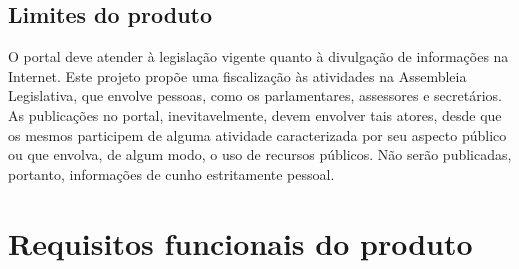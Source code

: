 \documentclass[12pt, a4paper]{article}
\begin{document}
        \subsection{Limites do produto}
        O portal deve atender à legislação vigente quanto à divulgação de
        informações na Internet. Este projeto propõe uma fiscalização às
        atividades na Assembleia Legislativa, que envolve pessoas, como os
        parlamentares, assessores e secretários. As publicações no portal,
        inevitavelmente, devem envolver tais atores, desde que os mesmos
        participem de alguma atividade caracterizada por seu aspecto público ou
        que envolva, de algum modo, o uso de recursos públicos. Não serão
        publicadas, portanto, informações de cunho estritamente pessoal.

    \section{Requisitos funcionais do produto}
\end{document}
